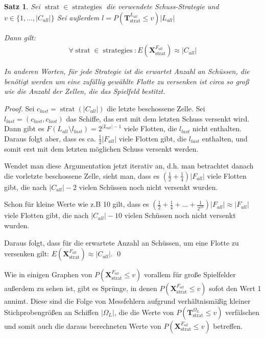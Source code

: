 \documentclass[a4paper,12pt]{llncs}
\numberwithin{equation}{section}
\newtheorem{satz}{Satz}
\DeclareMathOperator{\strat}{strat}
\DeclareMathOperator{\strategies}{strategies}
\begin{document}
\begin{satz}
Sei $\strat \in \strategies$ die verwendete Schuss-Strategie und $v \in \{1, \dots, |C_{all}|\}$
Sei außerdem $l=P(\mathbf{T}^{L_{all}}_{\strat} \leq v) |L_{all}|$

Dann gilt:
\begin{align}
\forall \strat \in \strategies \colon E(\mathbf{X}^{F_{all}}_{\strat}) \approx |C_{all}|
\nonumber
\end{align}

In anderen Worten, für jede Strategie ist die erwartet Anzahl an Schüssen, die benötigt werden um eine zufällig gewählte Flotte zu versenken ist circa so groß wie die Anzahl der Zellen, die das Spielfeld bestitzt.
\end{satz}

\begin{proof}
Sei $c_{last}=\strat(|C_{all}|)$ die letzte beschossene Zelle.
Sei $l_{last}=(c_{last}, c_{last})$ das Schiffe, das erst mit dem letzten Schuss versenkt wird.
Dann gibt es $F(L_{all} \setminus l_{last})=2^{|L_{all}|-1}$ viele Flotten, die $l_{last}$ nicht enthalten.
Daraus folgt aber, dass es ca. $\frac{1}{2} |F_{all}|$ viele Flotten gibt, die $l_{last}$ enthalten, und somit erst mit dem letzten möglichen Schuss versenkt werden.

Wendet man diese Argumentation jetzt iterativ an, d.h. man betrachtet danach die vorletzte beschossene Zelle, sieht man, dass es $(\frac{1}{2} + \frac{1}{4}) |F_{all}|$ viele Flotten gibt, die nach $|C_{all}| - 2$ vielen Schüssen noch nicht versenkt wurden.

Schon für kleine Werte wie z.B 10 gilt, dass es $(\frac{1}{2} + \frac{1}{4} + \dots + \frac{1}{2^{10}}) |F_{all}| \approx |F_{all}|$ viele Flotten gibt, die nach $|C_{all}| - 10$ vielen Schüssen noch nicht versenkt wurden.

Daraus folgt, dass für die erwartete Anzahl an Schüssen, um eine Flotte zu versenken gilt: $E(\mathbf{X}^{F_{all}}_{\strat}) \approx |C_{all}|$.
\qed
\end{proof}

Wie in einigen Graphen von $P(\mathbf{X}^{F_{all}}_{\strat} \leq v)$ vorallem für große Spielfelder außerdem zu sehen ist, gibt es Sprünge, in denen $P(\mathbf{X}^{F_{all}}_{\strat} \leq v)$ sofot den Wert 1 annimt. Diese sind die Folge von Messfehlern aufgrund verhältnismäßig kleiner Stichprobengrößen an Schiffen $|\Omega_L|$, die die Werte von $P(\mathbf{T}^{\Omega_L}_{\strat} \leq v)$ verfälschen und somit auch die daraus berechneten Werte von $P(\mathbf{X}^{F_{all}}_{\strat} \leq v)$ betreffen.
\end{document}
